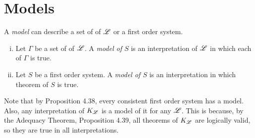\section{Models}

\begin{definition}
  A \textit{model} can describe a set of \wfs{} of \(\mathscr{L}\) or a first order system.
  \begin{enumerate}[(i)]
    \item Let \(\Gamma\) be a set of \wfs{} of \(\mathscr{L}\). A \textit{model of \(S\)} is an interpretation of \(\mathscr{L}\) in which each \wf{} of \(\Gamma\) is true.

    \item Let \(S\) be a first order system. A \textit{model of \(S\)} is an interpretation in which theorem of \(S\) is true.
  \end{enumerate}
\end{definition}

Note that by Proposition 4.38, every consistent first order system has a model. Also, any interpretation of \(K_{\mathscr{L}}\) is a model of it for any \(\mathscr{L}\). This is because, by the Adequacy Theorem, Proposition 4.39, all theorems of \(K_{\mathscr{L}}\) are logically valid, so they are true in all interpretations.

